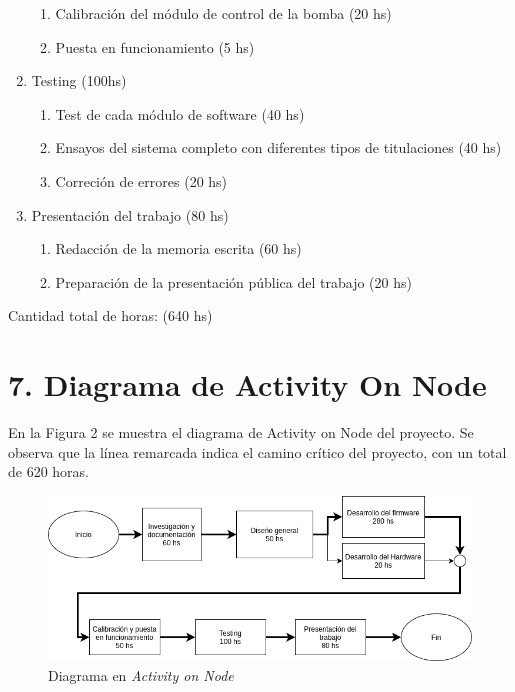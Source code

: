 \documentclass[11pt]{charter}
\begin{document}
\begin{enumerate}
\begin{enumerate}
	\item Calibración del módulo de control de la bomba (20 hs)
	\item Puesta en funcionamiento  (5 hs)
	\end{enumerate}
\item Testing (100hs)
	\begin{enumerate}	
	\item Test de cada módulo de software (40 hs)
	\item Ensayos del sistema completo con diferentes tipos de titulaciones (40 hs)
	\item Correción de errores (20 hs)
	\end{enumerate}
\item Presentación del trabajo (80 hs)
	\begin{enumerate}
	\item Redacción de la memoria escrita (60 hs)
	\item Preparación de la presentación pública del trabajo (20 hs)	
	\end{enumerate}
\end{enumerate}

Cantidad total de horas: (640 hs)

\section{7. Diagrama de Activity On Node}
\label{sec:AoN}
En la Figura 2 se muestra el diagrama de Activity on Node del proyecto. Se observa que la línea remarcada indica el camino crítico del proyecto, con un total de 620 horas.

\begin{figure}[htpb]
\centering 
\includegraphics[width=1\textwidth]{./Figuras/AoN.png}
\caption{Diagrama en \textit{Activity on Node}}
\label{fig:AoN}
\end{figure}
\end{document}
